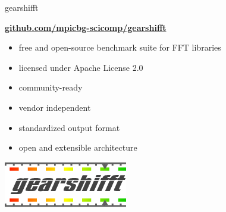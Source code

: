 \documentclass[t,10pt,hyperref={
  pdftitle = {gearshifft},
  pdfsubject = {gearshifft},
  pdfborder={0 0 0},
  colorlinks=true,
  urlcolor=red,
  citecolor=red,
  linkcolor=red,
  pdfauthor={Peter Steinbach, Matthias Werner}
  }
]{beamer}
\begin{document}
\begin{frame}{gearshifft}

\vfill
      \begin{center}\Large
        \href{https://github.com/mpicbg-scicomp/gearshifft}{\textbf{github.com/mpicbg-scicomp/gearshifft}}
      \end{center}

    

\vfill
  \begin{itemize}
  \item free and open-source benchmark suite for FFT libraries
  \item licensed under Apache License 2.0
  \item community-ready
  \item vendor independent 
  \item standardized output format
  \item open and extensible architecture
  \end{itemize}
\vfill
\pause
\begin{center}
  \includegraphics[width=.4\textwidth]{gearshifft_logo_img_100.png}
\end{center}

\vfill
\end{frame}
\end{document}
